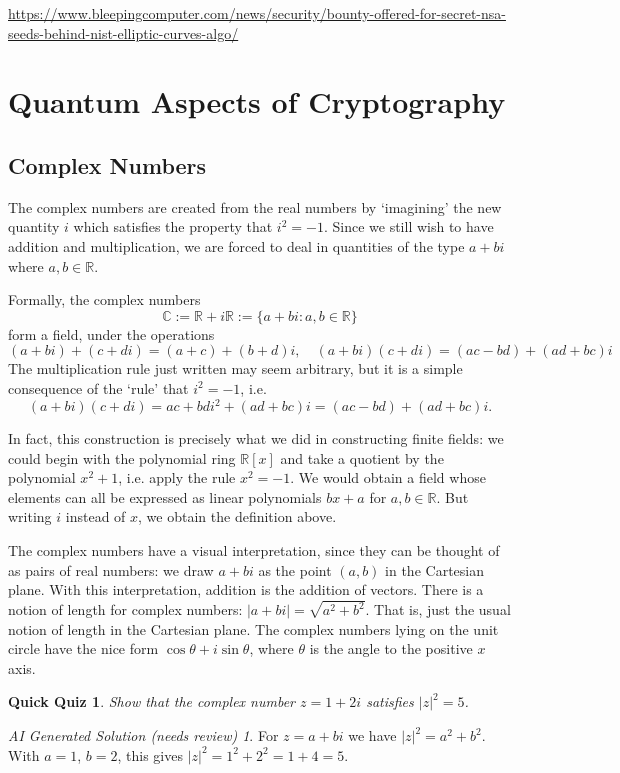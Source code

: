 \documentclass{article}
\theoremstyle{plain}
\newtheorem{quiz}[theorem]{Quick Quiz}
\theoremstyle{definition}
\theoremstyle{remark}
\newtheorem*{aisolution}{AI Generated Solution (needs review)}
\numberwithin{theorem}{section}
\newcommand{\RR}{\mathbb{R}}
\newcommand{\CC}{\mathbb{C}}
\begin{document}
\url{https://www.bleepingcomputer.com/news/security/bounty-offered-for-secret-nsa-seeds-behind-nist-elliptic-curves-algo/}



\section{Quantum Aspects of Cryptography}

\subsection{Complex Numbers}

The complex numbers are created from the real numbers by `imagining' the new quantity $i$ which satisfies the property that $i^2 = -1$.  Since we still wish to have addition and multiplication, we are forced to deal in quantities of the type $a+bi$ where $a,b \in \RR$.

Formally, the complex numbers
\[
\CC := \RR + i\RR := \{ a + bi : a,b \in \RR \}
\]
form a field, under the operations
\[
(a+bi)+(c+di) = (a+c) + (b+d)i, 
\quad
(a+bi)(c+di) = (ac - bd) + (ad+bc)i
\]
The multiplication rule just written may seem arbitrary, but it is a simple consequence of the `rule' that $i^2 = -1$, i.e.
\[
(a+bi)(c+di) = ac + bdi^2 + (ad+bc)i = (ac - bd) + (ad+bc)i.
\]

In fact, this construction is precisely what we did in constructing finite fields:  we could begin with the polynomial ring $\RR[x]$ and take a quotient by the polynomial $x^2+1$, i.e. apply the rule $x^2 = -1$.  We would obtain a field whose elements can all be expressed as linear polynomials $bx + a$ for $a,b \in \RR$.  But writing $i$ instead of $x$, we obtain the definition above.

The complex numbers have a visual interpretation, since they can be thought of as pairs of real numbers:  we draw $a+bi$ as the point $(a,b)$ in the Cartesian plane.  With this interpretation, addition is the addition of vectors.  There is a notion of length for complex numbers: $|a+bi| = \sqrt{a^2 + b^2}$.  That is, just the usual notion of length in the Cartesian plane.  The complex numbers lying on the unit circle have the nice form $\cos \theta + i \sin \theta$, where $\theta$ is the angle to the positive $x$ axis.

\begin{quiz}
    Show that the complex number $z = 1+2i$ satisfies $|z|^2 = 5$.
\end{quiz}
\begin{aisolution}
For $z = a+bi$ we have $|z|^2 = a^2 + b^2$.  With $a = 1$, $b = 2$, this gives $|z|^2 = 1^2 + 2^2 = 1 + 4 = 5$.
\end{aisolution}
\end{document}
